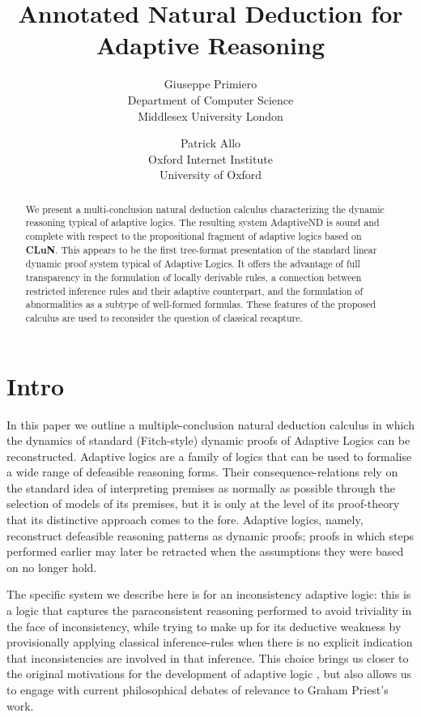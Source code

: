 \documentclass[]{article}
\title{Annotated Natural Deduction for Adaptive Reasoning}
\author{Giuseppe Primiero\\
Department of Computer Science\\
Middlesex University London\\
 \and Patrick Allo\\
 Oxford Internet Institute\\
 University of Oxford}
\date{}
\begin{document}
\maketitle

\begin{abstract}
We present a multi-conclusion natural deduction calculus characterizing the dynamic reasoning typical of adaptive logics. The resulting system {\sf AdaptiveND} is sound and complete with respect to the propositional fragment of adaptive logics based on  \textbf{CLuN}. This appears to be the first tree-format presentation of the standard linear dynamic proof system typical of Adaptive Logics. It offers the advantage of full transparency in the formulation of locally derivable rules, a connection between restricted inference rules and their adaptive counterpart, and the formulation of abnormalities as a subtype of well-formed formulas. These features of the proposed calculus are used to reconsider the question of classical recapture.
\end{abstract}

\section{Intro}

In this paper we outline a multiple-conclusion natural deduction calculus in which the dynamics of standard (Fitch-style) dynamic proofs of Adaptive Logics \cite{batens07} can be reconstructed. Adaptive logics are a family of logics that can be used to formalise a wide range of defeasible reasoning forms. Their consequence-relations rely on the standard idea of interpreting premises as normally as possible through the selection of models of its premises, but it is only at the level of its proof-theory that its distinctive approach comes to the fore. Adaptive logics, namely, reconstruct defeasible reasoning patterns as dynamic proofs; proofs in which steps performed earlier may later be retracted when the assumptions they were based on no longer hold.

The specific system we describe here is for an inconsistency adaptive logic: this is a logic that captures the paraconsistent reasoning performed to avoid triviality in the face of inconsistency, while trying to make up for its deductive weakness by provisionally applying classical inference-rules when there is no explicit indication that inconsistencies are involved in that inference. This choice brings us closer to the original motivations for the development of adaptive logic \cite{Batens:ParaconsistentLogicEssaysOnTheInconsistent:1989}, but also allows us to engage with current philosophical debates of relevance to Graham Priest's work.
\end{document}
